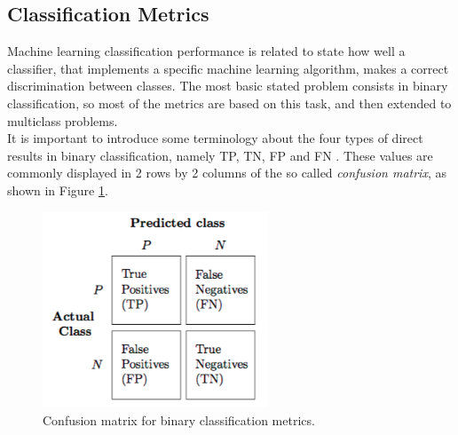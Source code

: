 \subsection{Classification Metrics}

Machine learning classification performance is related to state how well a classifier, that implements a specific machine learning algorithm, makes a correct discrimination between classes. The most basic stated problem consists in binary classification, so most of the metrics are based on this task, and then extended to multiclass problems.\\
It is important to introduce some terminology about the four types of direct results in binary classification, namely \ac{TP}, \ac{TN}, \ac{FP} and \ac{FN} \cite{inproceedings-bin-metrics}. These values are commonly displayed in 2 rows by 2 columns of the so called \textit{confusion matrix}, as shown in Figure \ref{fig:confusion-matrix}. 


\begin{figure}[ht]
	\centering
	\includegraphics[width=0.6\textwidth]{figures/confusion_matrix.png}
	\caption{Confusion matrix for binary classification metrics.}
	\label{fig:confusion-matrix}
\end{figure}


